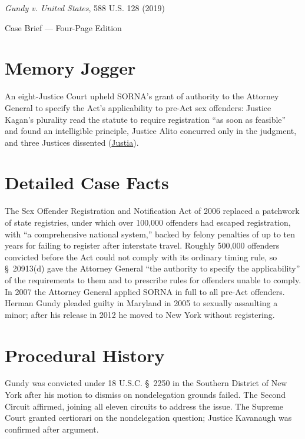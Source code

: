 \documentclass[12pt]{article}
\begin{document}
\begin{center}
{\LARGE \textit{Gundy v. United States}, 588 U.S. 128 (2019)\par}
\vspace{0.8em}
{\large Case Brief --- Four-Page Edition\par}
\end{center}
\vspace{1em}

\section{Memory Jogger}

An eight-Justice Court upheld SORNA's grant of authority to the Attorney General to specify the Act's applicability to pre-Act sex offenders: Justice Kagan's plurality read the statute to require registration ``as soon as feasible'' and found an intelligible principle, Justice Alito concurred only in the judgment, and three Justices dissented (\href{https://supreme.justia.com/cases/federal/us/588/17-6086/}{Justia}).

\section{Detailed Case Facts}

The Sex Offender Registration and Notification Act of 2006 replaced a patchwork of state registries, under which over 100,000 offenders had escaped registration, with ``a comprehensive national system,'' backed by felony penalties of up to ten years for failing to register after interstate travel. Roughly 500,000 offenders convicted before the Act could not comply with its ordinary timing rule, so \S~20913(d) gave the Attorney General ``the authority to specify the applicability'' of the requirements to them and to prescribe rules for offenders unable to comply. In 2007 the Attorney General applied SORNA in full to all pre-Act offenders. Herman Gundy pleaded guilty in Maryland in 2005 to sexually assaulting a minor; after his release in 2012 he moved to New York without registering.

\section{Procedural History}

Gundy was convicted under 18 U.S.C. \S~2250 in the Southern District of New York after his motion to dismiss on nondelegation grounds failed. The Second Circuit affirmed, joining all eleven circuits to address the issue. The Supreme Court granted certiorari on the nondelegation question; Justice Kavanaugh was confirmed after argument.
\end{document}
